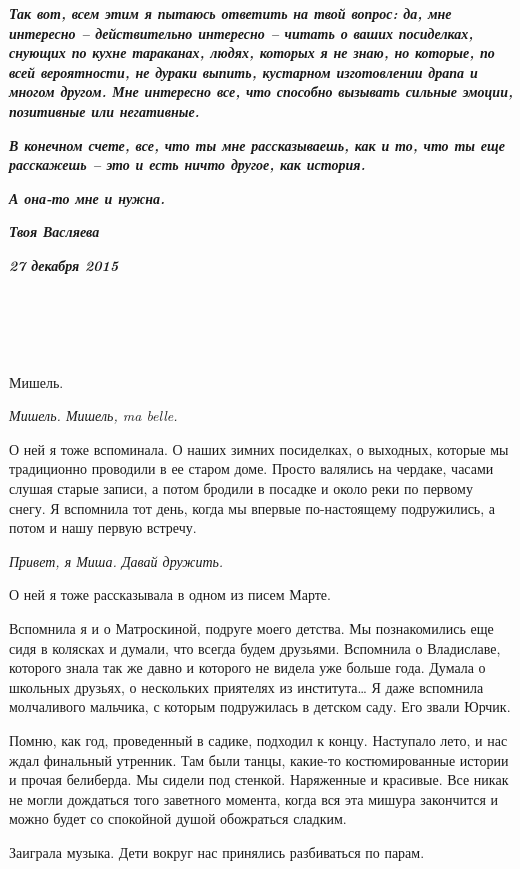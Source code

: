 \documentclass[
]{book}
\begin{document}
\textbf{\emph{
Так вот, всем этим я пытаюсь ответить на твой вопрос: да, мне интересно -- действительно интересно -- читать о ваших посиделках, снующих по кухне тараканах, людях, которых я не знаю, но которые, по всей вероятности, не дураки выпить, кустарном изготовлении драпа и многом другом. Мне интересно все, что способно вызывать сильные эмоции, позитивные или негативные.
}}

\textbf{\emph{
В конечном счете, все, что ты мне рассказываешь, как и то, что ты еще расскажешь -- это и есть ничто другое, как история.
}}

\textbf{\emph{
А она-то мне и нужна.
}}

\textbf{\emph{
Твоя Васляева
}}

\textbf{\emph{
27 декабря 2015
}}

\hypertarget{chapter-91}{%
\chapter{~}\label{chapter-91}}

Мишель.

\emph{Мишель. Мишель, ma belle.}

О ней я тоже вспоминала. О наших зимних посиделках, о выходных, которые мы традиционно проводили в ее старом доме. Просто валялись на чердаке, часами слушая старые записи, а потом бродили в посадке и около реки по первому снегу. Я вспомнила тот день, когда мы впервые по-настоящему подружились, а потом и нашу первую встречу.

\emph{Привет, я Миша. Давай дружить.}

О ней я тоже рассказывала в одном из писем Марте.

Вспомнила я и о Матроскиной, подруге моего детства. Мы познакомились еще сидя в колясках и думали, что всегда будем друзьями. Вспомнила о Владиславе, которого знала так же давно и которого не видела уже больше года. Думала о школьных друзьях, о нескольких приятелях из института\ldots{} Я даже вспомнила молчаливого мальчика, с которым подружилась в детском саду. Его звали Юрчик.

Помню, как год, проведенный в садике, подходил к концу. Наступало лето, и нас ждал финальный утренник. Там были танцы, какие-то костюмированные истории и прочая белиберда. Мы сидели под стенкой. Наряженные и красивые. Все никак не могли дождаться того заветного момента, когда вся эта мишура закончится и можно будет со спокойной душой обожраться сладким.

Заиграла музыка. Дети вокруг нас принялись разбиваться по парам.
\end{document}
